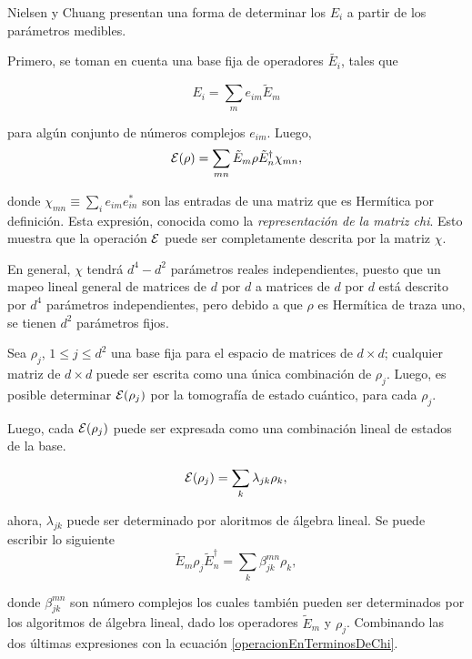 Nielsen y Chuang {\cite{nielsen_chuang_2010}} presentan una forma de determinar los $E_i$  a partir de los parámetros medibles.

Primero, se toman en cuenta una base fija de operadores $\tilde{E_i}$, tales que 

\begin{equation}\label{Basefija}
    E_i=\sum_m e_{im}\tilde{E}_m
\end{equation}

para algún conjunto de números complejos $e_{im}$. Luego, 
\begin{equation}\label{operacionEnTerminosDeChi}
    \mathcal{E}(\rho)=\sum_{mn}\tilde{E}_m\rho \tilde{E}_n^\dagger \chi_{mn},
\end{equation}

donde $\chi_{mn}\equiv \sum_i e_{im}e_{in}^*$ son las entradas de una matriz que es Hermítica por definición. Esta expresión, conocida como la \textit{representación de la matriz chi}. Esto muestra que la operación $\mathcal{E}$ puede ser completamente descrita por la matriz $\chi$.

En general, $\chi$ tendrá $d^4-d^2$ parámetros reales independientes, puesto que un mapeo lineal general de matrices de $d$ por $d$ a matrices de $d$ por $d$ está descrito por $d^4$ parámetros independientes, pero debido a que $\rho$ es Hermítica de traza uno, se tienen $d^2$ parámetros fijos.

Sea $\rho_j$, $1 \le j\le d^2$ una base fija para el espacio de matrices de $d\times d$; cualquier matriz de $d\times d$ puede ser escrita como una única combinación de $\rho_j$. Luego, es posible determinar $\mathcal{E}(\rho_j)$ por la tomografía de estado cuántico, para cada $\rho_j$.

Luego, cada $\mathcal{E}(\rho_j)$ puede ser expresada como una combinación lineal de estados de la base.

\begin{equation}\label{E_en_terminos_de_la_base}
    \mathcal{E}(\rho_j)=\sum_k \lambda _{jk}\rho_k,
\end{equation}

ahora, $\lambda_{jk}$ puede ser determinado por aloritmos de álgebra lineal. Se puede escribir lo siguiente
\begin{equation}
    \tilde{E}_m\rho_j \tilde{E}_n^\dagger=\sum_k\beta_{jk}^{mn}\rho_k,
\end{equation}

donde $\beta_{jk}^{mn}$ son número complejos los cuales también pueden ser determinados por los algoritmos de álgebra lineal, dado los operadores $\tilde{E}_m$ y $\rho_j$.  Combinando las dos últimas expresiones con la ecuación {\ref{operacionEnTerminosDeChi}}.


